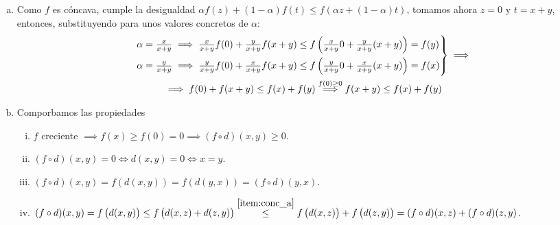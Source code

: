 \begin{eje}
    \begin{enumerate}[(a)]
        \item \label{item:conc_a} Como $f$ es cóncava, cumple la desigualdad $\alpha f(z) + (1-\alpha)f(t) \leq f\left( \alpha z + (1-\alpha)t \right)$, tomamos ahora
            $z = 0$ y $t=x+y$, entonces, substituyendo para unos valores concretos de $\alpha$:
            \begin{gather*}
                \begin{rcases}
                    \alpha = \frac{x}{x+y} \implies \frac{x}{x+y}f(0) + \frac{y}{x+y}f(x+y) \leq f\left( \frac{x}{x+y} 0 + \frac{y}{x+y}(x+y)\right) =f(y)\\
                    \alpha = \frac{y}{x+y} \implies \frac{y}{x+y}f(0) + \frac{x}{x+y}f(x+y) \leq f\left( \frac{y}{x+y} 0 + \frac{x}{x+y}(x+y)\right) =f(x)
                \end{rcases}
                \implies\\ \implies
                f(0) + f(x+y) \leq f(x) + f(y) \stackrel{f(0) \geq 0}{\implies} f(x+y) \leq f(x) + f(y)
            \end{gather*}
        \item Comporbamos las propiedades
            \begin{enumerate}[i)]
                \item $f$ creciente $\implies f(x) \geq f(0) = 0 \implies (f \circ d)(x,y) \geq 0$.
                \item $(f \circ d)(x,y) = 0 \iff d(x,y) = 0 \iff x = y$.
                \item $(f \circ d)(x,y) = f\left( d(x,y) \right) = f\left( d(y,x) \right) = (f \circ d)(y,x)$.
                \item $(f \circ d)(x,y) = f\left( d(x,y) \right) \leq f\left( d(x,z) + d(z,y) \right) \stackrel{\ref{item:conc_a}}{\leq}f\left( d(x,z) \right) +
                    f\left( d(z,y) \right) = (f \circ d)(x,z) + (f \circ d)(z,y)$.
            \end{enumerate}
    \end{enumerate}
\end{eje}

